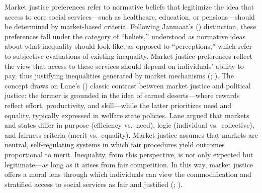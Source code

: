 \documentclass[
  12pt,
]{article}
\begin{document}
Market justice preferences refer to normative beliefs that legitimize
the idea that access to core social services---such as healthcare,
education, or pensions---should be determined by market-based criteria.
Following Janmaat's () distinction, these preferences fall under the category of
``beliefs,'' understood as normative ideas about what inequality should
look like, as opposed to ``perceptions,'' which refer to subjective
evaluations of existing inequality. Market justice preferences reflect
the view that access to these services should depend on individuals'
ability to pay, thus justifying inequalities generated by market
mechanisms (; ). The concept draws
on Lane's () classic contrast
between market justice and political justice: the former is grounded in
the idea of earned deserts---where rewards reflect effort, productivity,
and skill---while the latter prioritizes need and equality, typically
expressed in welfare state policies. Lane argued that markets and states
differ in purpose (efficiency vs.~need), logic (individual
vs.~collective), and fairness criteria (merit vs.~equality). Market
justice assumes that markets are neutral, self-regulating systems in
which fair procedures yield outcomes proportional to merit. Inequality,
from this perspective, is not only expected but legitimate---as long as
it arises from fair competition. In this way, market justice offers a
moral lens through which individuals can view the commodification and
stratified access to social services as fair and justified
(;
).
\end{document}
